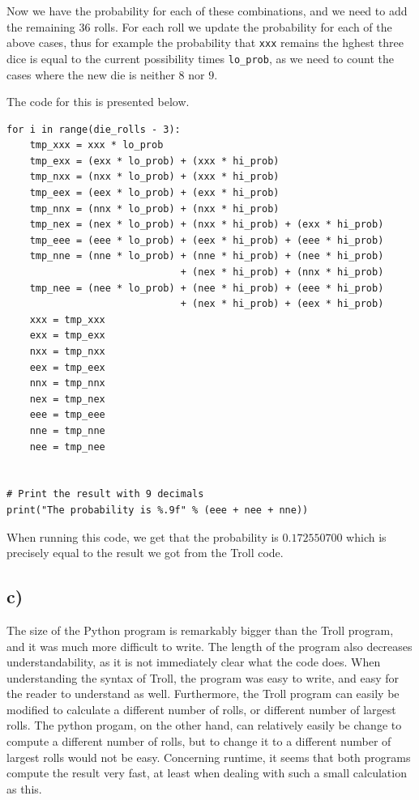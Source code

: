 Now we have the probability for each of these combinations, and we need to add the remaining $36$ rolls. For each roll we update the probability for each of the above cases, thus for example the probability that \texttt{xxx} remains the hghest three dice is equal to the current possibility times \texttt{lo\_prob}, as we need to count the cases where the new die is neither $8$ nor $9$.

The code for this is presented below.

\begin{verbatim}
for i in range(die_rolls - 3):
    tmp_xxx = xxx * lo_prob
    tmp_exx = (exx * lo_prob) + (xxx * hi_prob)
    tmp_nxx = (nxx * lo_prob) + (xxx * hi_prob)
    tmp_eex = (eex * lo_prob) + (exx * hi_prob)
    tmp_nnx = (nnx * lo_prob) + (nxx * hi_prob)
    tmp_nex = (nex * lo_prob) + (nxx * hi_prob) + (exx * hi_prob)
    tmp_eee = (eee * lo_prob) + (eex * hi_prob) + (eee * hi_prob)
    tmp_nne = (nne * lo_prob) + (nne * hi_prob) + (nee * hi_prob)
                              + (nex * hi_prob) + (nnx * hi_prob)
    tmp_nee = (nee * lo_prob) + (nee * hi_prob) + (eee * hi_prob)
                              + (nex * hi_prob) + (eex * hi_prob)
    xxx = tmp_xxx
    exx = tmp_exx
    nxx = tmp_nxx
    eex = tmp_eex
    nnx = tmp_nnx
    nex = tmp_nex
    eee = tmp_eee
    nne = tmp_nne
    nee = tmp_nee


# Print the result with 9 decimals
print("The probability is %.9f" % (eee + nee + nne))
\end{verbatim}

When running this code, we get that the probability is $0.172550700$ which is precisely equal to the result we got from the Troll code.


\subsection*{c)}
The size of the Python program is remarkably bigger than the Troll program, and it was much more difficult to write. The length of the program also decreases understandability, as it is not immediately clear what the code does. When understanding the syntax of Troll, the program was easy to write, and easy for the reader to understand as well. 
Furthermore, the Troll program can easily be modified to calculate a different number of rolls, or different number of largest rolls. The python progam, on the other hand, can relatively easily be change to compute a different number of rolls, but to change it to a different number of largest rolls would not be easy.
Concerning runtime, it seems that both programs compute the result very fast, at least when dealing with such a small calculation as this.

